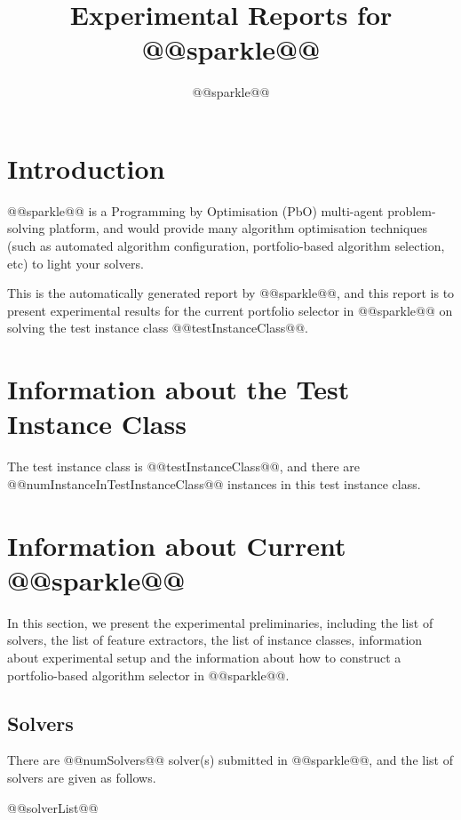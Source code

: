 \documentclass[british]{article}
\title{Experimental Reports for @@sparkle@@ }
\author{ @@sparkle@@ }
\begin{document}
\maketitle %


\section{Introduction}
\label{sec:Introduction}

@@sparkle@@ \cite{Hoos15} is a Programming by Optimisation (PbO) \cite{Hoos12} multi-agent problem-solving platform, and would provide many algorithm optimisation techniques (such as automated algorithm configuration, portfolio-based algorithm selection, etc) to light your solvers. 

This is the automatically generated report by @@sparkle@@, and this report is to present experimental results for the current portfolio selector in @@sparkle@@ on solving the test instance class @@testInstanceClass@@.


\section{Information about the Test Instance Class}
\label{sec:Information_about_the_Test_Instance_Class}

The test instance class is @@testInstanceClass@@, and there are @@numInstanceInTestInstanceClass@@ instances in this test instance class.


\section{Information about Current @@sparkle@@}
\label{sec:Information_about_Current_Sparkle}

In this section, we present the experimental preliminaries, including the list of solvers, the list of feature extractors, the list of instance classes, information about experimental setup and the information about how to construct a portfolio-based algorithm selector in @@sparkle@@.

\subsection{Solvers}
\label{sec:Solvers}
There are @@numSolvers@@ solver(s) submitted in @@sparkle@@, and the list of solvers are given as follows.


\begin{enumerate} 
@@solverList@@
\end{enumerate}
\end{document}
